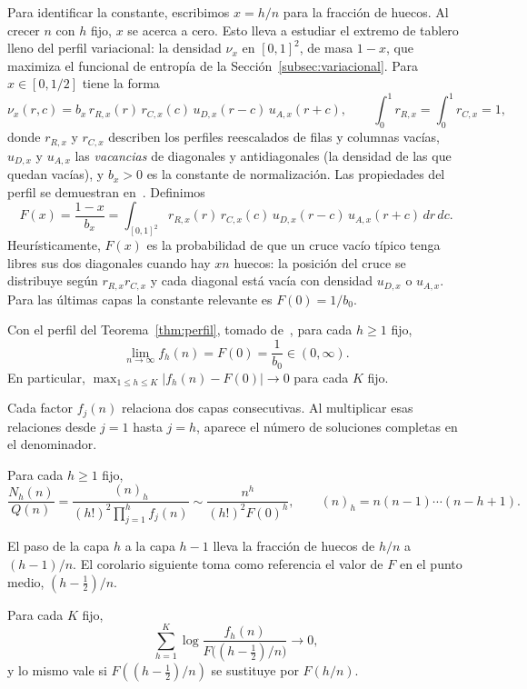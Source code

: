 Para identificar la constante, escribimos $x=h/n$ para la fracción de huecos. Al crecer $n$
con $h$ fijo, $x$ se acerca a cero. Esto lleva a estudiar el extremo de tablero lleno del perfil
variacional: la densidad $\nu_x$ en $[0,1]^2$, de masa $1-x$, que maximiza el funcional de
entropía de la Sección~\ref{subsec:variacional}. Para $x\in[0,1/2]$ tiene la forma
\[
 \nu_x(r,c)=b_x\,r_{R,x}(r)\,r_{C,x}(c)\,u_{D,x}(r-c)\,u_{A,x}(r+c),
 \qquad \int_0^1 r_{R,x}=\int_0^1 r_{C,x}=1,
\]
donde $r_{R,x}$ y $r_{C,x}$ describen los perfiles reescalados de filas y columnas
vacías, $u_{D,x}$ y $u_{A,x}$ las \emph{vacancias} de diagonales y antidiagonales (la densidad
de las que quedan vacías), y $b_x>0$ es la constante de normalización. Las propiedades del perfil se
demuestran en~\cite{Perfil}. Definimos
\begin{equation}\label{eq:F}
 F(x)=\frac{1-x}{b_x}=\int_{[0,1]^2}r_{R,x}(r)\,r_{C,x}(c)\,u_{D,x}(r-c)\,u_{A,x}(r+c)\,dr\,dc .
\end{equation}
Heurísticamente, $F(x)$ es la probabilidad de que un cruce vacío típico tenga libres sus dos
diagonales cuando hay $xn$ huecos: la posición del cruce se distribuye según $r_{R,x}r_{C,x}$ y
cada diagonal está vacía con densidad $u_{D,x}$ o $u_{A,x}$. Para las últimas capas la constante
relevante es $F(0)=1/b_0$.

\begin{teorema}\label{thm:limite}
Con el perfil del Teorema~\ref{thm:perfil}, tomado de~\cite{Perfil}, para cada $h\ge1$ fijo,
\[
 \lim_{n\to\infty}f_h(n)=F(0)=\frac1{b_0}\in(0,\infty).
\]
En particular, $\max_{1\le h\le K}|f_h(n)-F(0)|\to0$ para cada $K$ fijo.
\end{teorema}

Cada factor $f_j(n)$ relaciona dos capas consecutivas. Al multiplicar esas relaciones
desde $j=1$ hasta $j=h$, aparece el número de soluciones completas en el denominador.

\begin{corolario}\label{cor:cociente}
Para cada $h\ge1$ fijo,
\[
 \frac{N_h(n)}{Q(n)}=\frac{(n)_h}{(h!)^2\prod_{j=1}^hf_j(n)}
 \sim\frac{n^h}{(h!)^2F(0)^h},\qquad (n)_h=n(n-1)\cdots(n-h+1).
\]
\end{corolario}

El paso de la capa $h$ a la capa $h-1$ lleva la fracción de huecos de $h/n$ a
$(h-1)/n$. El corolario siguiente toma como referencia el valor de $F$ en el punto
medio, $(h-\tfrac12)/n$.

\begin{corolario}\label{cor:capas}
Para cada $K$ fijo,
\[
 \sum_{h=1}^K\log\frac{f_h(n)}{F\bigl((h-\tfrac12)/n\bigr)}\longrightarrow0,
\]
y lo mismo vale si $F((h-\tfrac12)/n)$ se sustituye por $F(h/n)$.
\end{corolario}

